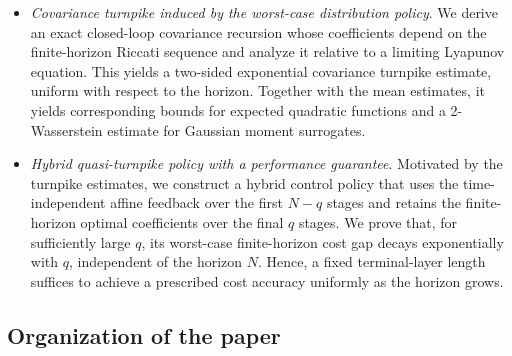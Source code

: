 \documentclass[10pt,journal,twoside]{IEEEtran}
\theoremstyle{definition}
\theoremstyle{remark}
\begin{document}
\begin{itemize}
	
	\item {\it Covariance turnpike induced by the worst-case distribution policy}.
     We derive an exact closed-loop covariance recursion whose coefficients depend on the finite-horizon Riccati sequence and analyze it relative to a limiting Lyapunov equation. This yields a two-sided exponential covariance turnpike estimate, uniform with respect to the horizon. Together with the mean estimates, it yields corresponding bounds for expected quadratic functions and a 2-Wasserstein estimate for Gaussian moment surrogates.

     \item {\it Hybrid quasi-turnpike policy with a performance guarantee}. Motivated by the turnpike estimates, we construct a hybrid control policy that uses the time-independent affine feedback over the first $N-q$ stages and retains the finite-horizon optimal coefficients over the final $q$ stages. We prove that, for sufficiently large $q$, its worst-case finite-horizon cost gap decays exponentially with $q$, independent of the horizon $N$. Hence, a fixed terminal-layer length suffices to achieve a prescribed cost accuracy uniformly as the horizon grows.
     
	
\end{itemize}


\subsection{Organization of the paper}
\end{document}
